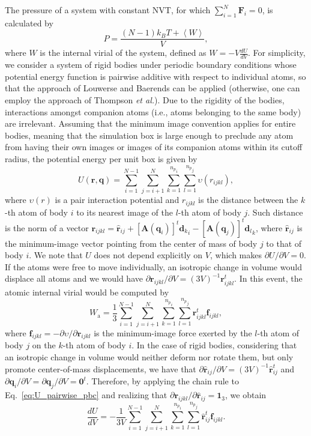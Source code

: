 \documentclass[aip,jcp,reprint,amsmath,amssymb,raggedbottom]{revtex4-1}
\newcommand{\mt}[1]{\boldsymbol{\mathbf{#1}}}           %
\newcommand{\vt}[1]{\boldsymbol{\mathbf{#1}}}           %
\newcommand{\tr}[1]{#1^t}                               %
\begin{document}
The pressure of a system with constant NVT, for which $\sum_{i=1}^N{\vt F}_i = 0$, is calculated by\cite{Louwerse2006, Tuckerman2001}
\[
P = \frac{(N-1) k_B T + \left\langle W \right\rangle}{V},
\]
where $W$ is the internal virial of the system, defined as $W = - V \frac{dU}{dV}$. For simplicity, we consider a system of rigid bodies under periodic boundary conditions whose potential energy function is pairwise additive with respect to individual atoms, so that the approach of Louwerse and Baerends\cite{Louwerse2006} can be applied (otherwise, one can employ the approach of Thompson \textit{et al.}\cite{Thompson2009}). Due to the rigidity of the bodies, interactions amongst companion atoms (i.e., atoms belonging to the same body) are irrelevant. Assuming that the minimum image convention\cite{Allen1989} applies for entire bodies, meaning that the simulation box is large enough to preclude any atom from having their own images or images of its companion atoms within its cutoff radius, the potential energy per unit box is given by
\begin{equation}
\label{eq:U_pairwise_pbc}
U({\vt r}, {\vt q}) = \sum_{i=1}^{N-1} \sum_{j=i+1}^N \sum_{k=1}^{{n_p}_i} \sum_{l=1}^{{n_p}_j} \upsilon(r_{ijkl}),
\end{equation}
where $\upsilon(r)$ is a pair interaction potential and $r_{ijkl}$ is the distance between the $k$-th atom of body $i$ to its nearest image of the $l$-th atom of body $j$. Such distance is the norm of a vector ${\vt r}_{ijkl} = \hat{\vt r}_{ij} + \tr{[{\mt A}({\vt q}_i)]}{{\vt d}_k}_i - \tr{[{\mt A}({\vt q}_j)]}{{\vt d}_l}_k$, where $\hat{\vt r}_{ij}$ is the minimum-image vector pointing from the center of mass of body $j$ to that of body $i$. We note that $U$ does not depend explicitly on $V$, which makes ${\partial U}/{\partial V} = 0$. If the atoms were free to move individually, an isotropic change in volume would displace all atoms and we would have ${\partial {\vt r}_{ijkl}}/{\partial V} = (3V)^{-1} \tr{\vt r}_{ijkl}$.\cite{Louwerse2006} In this event, the atomic internal virial would be computed by
\begin{equation}
\label{eq:virial_atoms}
W_\text{a} = \frac{1}{3} \sum_{i=1}^{N-1} \sum_{j=i+1}^N \sum_{k=1}^{{n_p}_i} \sum_{l=1}^{{n_p}_j} \tr{\vt r}_{ijkl} {\vt f}_{ijkl},
\end{equation}
where $\vt f_{ijkl} = -{\partial \upsilon}/{\partial \vt r_{ijkl}}$ is the minimum-image force exerted by the $l$-th atom of body $j$ on the $k$-th atom of body $i$. In the case of rigid bodies, considering that an isotropic change in volume would neither deform nor rotate them, but only promote center-of-mass displacements, we have that ${\partial \hat{\vt r}_{ij}}/{\partial V} = (3V)^{-1} \tr{\hat{\vt r}}_{ij}$ and ${\partial {\vt q}_i}/{\partial V} = {\partial {\vt q}_j}/{\partial V} = \tr{\vt 0}$. Therefore, by applying the chain rule to Eq.~\ref{eq:U_pairwise_pbc} and realizing that $\partial \vt r_{ijkl}/\partial \hat{\vt r}_{ij} = \vt 1_3$, we obtain
\[
\label{eq:dUdV_rigid_bodies}
\frac{dU}{dV} = -\frac{1}{3V} \sum_{i=1}^{N-1} \sum_{j=i+1}^N \sum_{k=1}^{{n_p}_i} \sum_{l=1}^{{n_p}_j} \tr{\hat{\vt r}}_{ij} \vt f_{ijkl}.
\]
\end{document}
